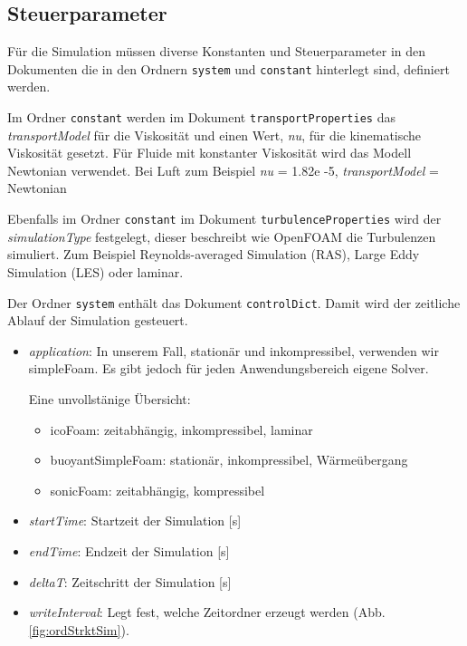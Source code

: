 \subsection{Steuerparameter \label{openfoam:section:Steuerparameter}}
Für die Simulation müssen diverse Konstanten und Steuerparameter in den Dokumenten die in den Ordnern \texttt{system} und \texttt{constant} hinterlegt sind, definiert werden.

Im Ordner \texttt{constant} werden im Dokument \texttt{transportProperties} das \textit{transportModel} für die Viskosität und einen Wert, \textit{nu}, für die kinematische Viskosität gesetzt.
%
Für Fluide mit konstanter Viskosität wird das Modell Newtonian verwendet. Bei Luft zum Beispiel \textit{nu} = 1.82e -5, \textit{transportModel} = Newtonian
%

Ebenfalls im Ordner \texttt{constant} im Dokument \texttt{turbulenceProperties} wird der \textit{simulationType} festgelegt, dieser beschreibt wie OpenFOAM die Turbulenzen simuliert.
Zum Beispiel Reynolds-averaged Simulation (RAS), Large Eddy Simulation (LES) oder laminar.

Der Ordner \texttt{system} enthält das Dokument \texttt{controlDict}. Damit wird der zeitliche Ablauf der Simulation gesteuert.

\begin{itemize}
    \item \textit{application}: In unserem Fall, stationär und inkompressibel, 
%
    verwenden wir simpleFoam. Es gibt jedoch für jeden Anwendungsbereich eigene Solver.

    Eine unvollstänige Übersicht:
    \begin{itemize}
        \item icoFoam: zeitabhängig, inkompressibel, laminar
        \item buoyantSimpleFoam: stationär, inkompressibel, Wärmeübergang
        \item sonicFoam: zeitabhängig, kompressibel
    \end{itemize}
    \item \textit{startTime}: Startzeit der Simulation [s]
%
    \item \textit{endTime}: Endzeit der Simulation [s]
%
    \item \textit{deltaT}: Zeitschritt der Simulation [s]
%
    \item \textit{writeInterval}: Legt fest, welche Zeitordner erzeugt werden (Abb. \ref{fig:ordStrktSim}).
%
\end{itemize}

